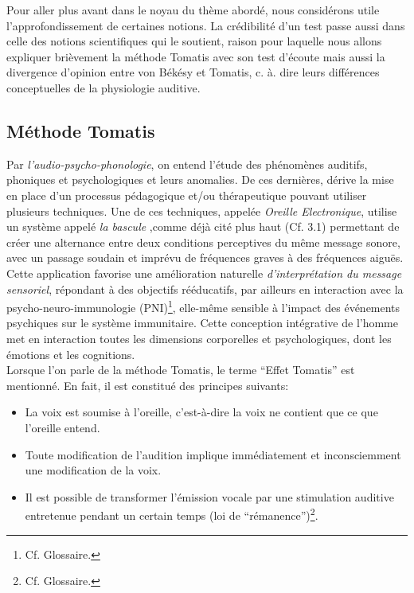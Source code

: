 

Pour aller plus avant dans le noyau du thème abordé, nous considérons utile
l'approfondissement de certaines notions. La crédibilité d'un test passe aussi dans celle des 
notions scientifiques qui le soutient, raison pour laquelle nous allons expliquer brièvement  la 
méthode Tomatis avec son test d'écoute mais aussi la
divergence d'opinion entre von Békésy et Tomatis, c. à. dire leurs différences conceptuelles de la 
physiologie auditive. 
\subsection{Méthode Tomatis}
Par {\textit{l'audio-psycho-phonologie}}, on entend l'étude des
phénomènes auditifs, phoniques et psychologiques et leurs anomalies.
De ces dernières,  dérive la mise en place d'un processus pédagogique
et/ou thérapeutique pouvant
utiliser plusieurs techniques.
Une de ces techniques,
  appelée
\label{outil_oreille_electro}
\textit{Oreille Electronique}, utilise
un système appelé \textit{ la
bascule} \autocite{escera-key},comme déjà cité plus haut (Cf. 3.1) permettant de créer une alternance 
entre deux conditions perceptives
du même message sonore, avec un passage soudain et imprévu de fréquences graves à des
fréquences aiguës.
Cette application favorise une amélioration naturelle \emph{d'interprétation du message
sensoriel}, répondant à des objectifs rééducatifs, par ailleurs en
interaction avec la psycho-neuro-immunologie (\gls{PNI})\footnote{Cf. Glossaire.}, elle-même sensible à
l'impact des événements psychiques sur le système immunitaire.
Cette conception intégrative de l'homme met en interaction toutes les
dimensions corporelles et psychologiques, dont les émotions et les cognitions.
\\
Lorsque l'on parle de la méthode Tomatis, le terme ``Effet Tomatis'' \autocite{tomatis_conf1972} est 
mentionné.
En fait, il est constitué des principes suivants:
\begin{itemize}
	\item La voix est soumise à l'oreille, c'est-à-dire la voix ne contient que ce que l'oreille entend.
	\item Toute modification de l'audition implique immédiatement
          et inconsciemment une
          modification de la voix.
	\item Il est possible de transformer l'émission vocale par une stimulation
auditive
		entretenue pendant un certain temps (loi de
               ``\gls{rémanence}'')\footnote{Cf. Glossaire.}.
\end{itemize}
